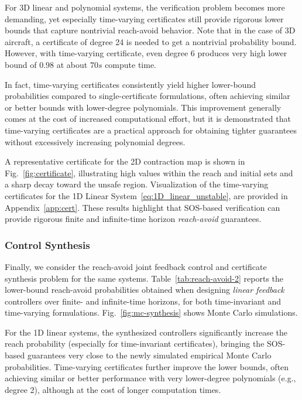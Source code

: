 \documentclass[journal,twoside,web]{ieeecolor}
\theoremstyle{definition}
\theoremstyle{plain}
\theoremstyle{plain}
\begin{document}
For 3D linear and polynomial systems, the verification problem becomes more demanding, yet especially time-varying certificates still provide rigorous lower bounds that capture nontrivial reach-avoid behavior.  Note that in the case of 3D aircraft, a certificate of degree 24 is needed to get a nontrivial probability bound.  However, with time-varying certificate, even degree 6 produces very high lower bound of $0.98$ at about $70s$ compute time.



In fact, time-varying certificates consistently yield higher lower-bound probabilities compared to single-certificate formulations, often achieving similar or better bounds with lower-degree polynomials. This improvement generally comes at the cost of increased computational effort, but it is demonstrated that time-varying certificates are a practical approach for obtaining tighter guarantees without excessively increasing polynomial degrees.

A representative certificate for the 2D contraction map is shown in Fig.~\ref{fig:certificate}, illustrating high values within the reach and initial sets and a sharp decay toward the unsafe region. 
Visualization of the
time-varying certificates for the 1D Linear System~\eqref{eq:1D_linear_unstable}, are provided in Appendix~\ref{app:cert}. These results highlight that SOS-based verification can provide rigorous finite and infinite-time horizon \emph{reach-avoid} guarantees. 



\subsubsection{Control Synthesis}
{Finally}, we consider the reach-avoid joint feedback control and certificate synthesis problem for the same systems. Table~\ref{tab:reach-avoid-2} reports the lower-bound reach-avoid probabilities obtained when designing \emph{linear feedback} controllers over finite- and infinite-time horizons, for both time-invariant and time-varying formulations. Fig.~\ref{fig:mc-synthesis} shows Monte Carlo simulations.

For the 1D linear systems, the synthesized controllers significantly increase the reach probability (especially for time-invariant certificates), bringing the SOS-based guarantees very close to the newly simulated empirical Monte Carlo probabilities. Time-varying certificates further improve the lower bounds, often achieving similar or better performance with very lower-degree polynomials (e.g., degree 2), although at the cost of longer computation times.
\end{document}
